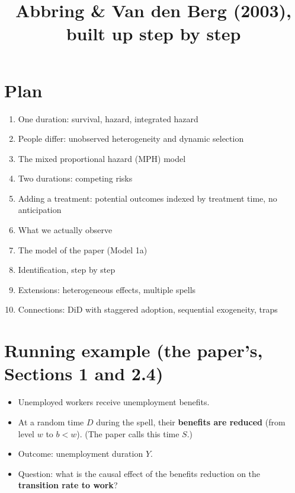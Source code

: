 \documentclass[11pt]{article}
\title{Abbring \& Van den Berg (2003), built up step by step}
\date{}
\newcommand{\1}{\mathbf{1}}
\begin{document}
\maketitle

\section*{Plan}
\begin{enumerate}
  \item One duration: survival, hazard, integrated hazard
  \item People differ: unobserved heterogeneity and dynamic selection
  \item The mixed proportional hazard (MPH) model
  \item Two durations: competing risks
  \item Adding a treatment: potential outcomes indexed by treatment time, no anticipation
  \item What we actually observe
  \item The model of the paper (Model 1a)
  \item Identification, step by step
  \item Extensions: heterogeneous effects, multiple spells
  \item Connections: DiD with staggered adoption, sequential exogeneity, traps
\end{enumerate}

\section*{Running example (the paper's, Sections 1 and 2.4)}
\begin{itemize}
  \item Unemployed workers receive unemployment benefits.
  \item At a random time $D$ during the spell, their \textbf{benefits are reduced} (from level $w$ to $b<w$). (The paper calls this time $S$.)
  \item Outcome: unemployment duration $Y$.
  \item Question: what is the causal effect of the benefits reduction on the \textbf{transition rate to work}?
\end{itemize}
\end{document}
